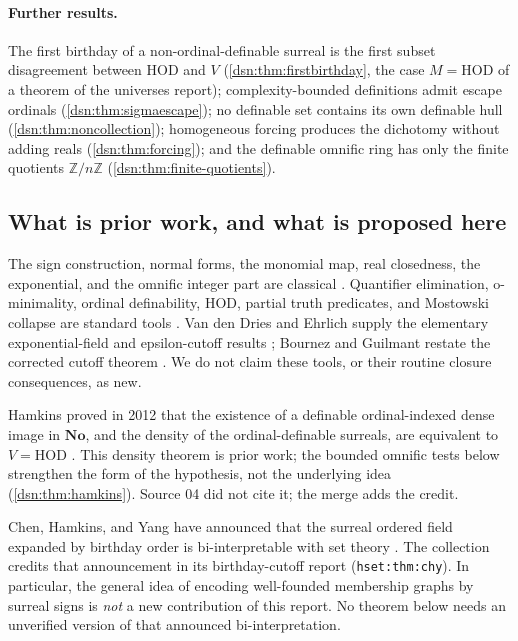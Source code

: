 \documentclass[11pt,a4paper]{article}
\numberwithin{equation}{section}
\theoremstyle{definition}
\theoremstyle{remark}
\newcommand{\No}{\mathbf{No}}
\newcommand{\HOD}{\mathrm{HOD}}
\newcommand{\Z}{\mathbb Z}
\newcommand{\lbl}[1]{\nolinkurl{#1}}
\begin{document}
\paragraph{Further results.}
The first birthday of a non-ordinal-definable surreal is the first
subset disagreement between $\HOD$ and $V$ (\cref{dsn:thm:firstbirthday},
the case $M=\HOD$ of a theorem of the universes report);
complexity-bounded definitions admit escape ordinals
(\cref{dsn:thm:sigmaescape}); no definable set contains its own definable
hull (\cref{dsn:thm:noncollection}); homogeneous forcing produces the
dichotomy without adding reals (\cref{dsn:thm:forcing}); and the
definable omnific ring has only the finite quotients $\Z/n\Z$
(\cref{dsn:thm:finite-quotients}).

\subsection{What is prior work, and what is proposed here}

The sign construction, normal forms, the monomial map, real closedness,
the exponential, and the omnific integer part are classical
\cite{Conway,Gonshor,vdDE,vdDEerr,LM}. Quantifier elimination, o-minimality,
ordinal definability, HOD, partial truth predicates, and Mostowski
collapse are standard tools \cite{Marker,vddTame,Jech,HLR}. Van den Dries
and Ehrlich supply the elementary exponential-field and epsilon-cutoff
results \cite{vdDE,vdDEerr}; Bournez and Guilmant restate the corrected
cutoff theorem \cite{BG}. We do not claim these tools, or their routine
closure consequences, as new.

Hamkins proved in 2012 that the existence of a definable
ordinal-indexed dense image in $\No$, and the density of the
ordinal-definable surreals, are equivalent to $V=\HOD$
\cite{HamkinsDensity}. This density theorem is prior work; the bounded
omnific tests below strengthen the form of the hypothesis, not the
underlying idea (\cref{dsn:thm:hamkins}). Source 04 did not cite it; the
merge adds the credit.

Chen, Hamkins, and Yang have announced that the surreal ordered field
expanded by birthday order is bi-interpretable with set theory
\cite{CHY}. The collection credits that announcement in its birthday-cutoff
report (\lbl{hset:thm:chy}). In particular, the general idea of encoding
well-founded membership graphs by surreal signs is \emph{not} a new
contribution of this report. No theorem below needs an unverified version
of that announced bi-interpretation.
\end{document}
